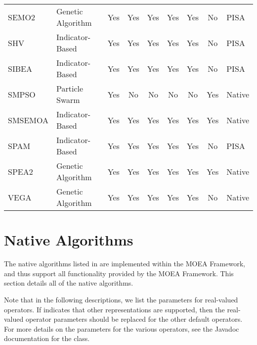 \begin{sidewaystable}
\begin{tabular}{ll|cccccc|l}
  SEMO2 & Genetic Algorithm & \cellcolor{green!25}Yes & \cellcolor{green!25}Yes & \cellcolor{green!25}Yes & \cellcolor{green!25}Yes & \cellcolor{green!25}Yes & \cellcolor{red!25}No & PISA \\
  SHV & Indicator-Based & \cellcolor{green!25}Yes & \cellcolor{green!25}Yes & \cellcolor{green!25}Yes & \cellcolor{green!25}Yes & \cellcolor{green!25}Yes & \cellcolor{red!25}No & PISA \\
  SIBEA & Indicator-Based & \cellcolor{green!25}Yes & \cellcolor{green!25}Yes & \cellcolor{green!25}Yes & \cellcolor{green!25}Yes & \cellcolor{green!25}Yes & \cellcolor{red!25}No & PISA \\
  SMPSO & Particle Swarm & \cellcolor{green!25}Yes & \cellcolor{red!25}No & \cellcolor{red!25}No & \cellcolor{red!25}No & \cellcolor{red!25}No & \cellcolor{green!25}Yes & Native \\
  SMSEMOA & Indicator-Based & \cellcolor{green!25}Yes & \cellcolor{green!25}Yes & \cellcolor{green!25}Yes & \cellcolor{green!25}Yes & \cellcolor{green!25}Yes & \cellcolor{green!25}Yes & Native \\
  SPAM & Indicator-Based & \cellcolor{green!25}Yes & \cellcolor{green!25}Yes & \cellcolor{green!25}Yes & \cellcolor{green!25}Yes & \cellcolor{green!25}Yes & \cellcolor{red!25}No & PISA \\
  SPEA2 & Genetic Algorithm & \cellcolor{green!25}Yes & \cellcolor{green!25}Yes & \cellcolor{green!25}Yes & \cellcolor{green!25}Yes & \cellcolor{green!25}Yes & \cellcolor{green!25}Yes & Native \\
  VEGA & Genetic Algorithm & \cellcolor{green!25}Yes & \cellcolor{green!25}Yes & \cellcolor{green!25}Yes & \cellcolor{green!25}Yes & \cellcolor{green!25}Yes & \cellcolor{red!25}No & Native \\
  \hline
  \end{tabular}
\end{sidewaystable}

\section{Native Algorithms}
The native algorithms listed in  are implemented within the MOEA Framework, and thus support all functionality provided by the MOEA Framework.  This section details all of the native algorithms.

Note that in the following descriptions, we list the parameters for real-valued operators.  If  indicates that other representations are supported, then the real-valued operator parameters should be replaced for the other default operators.  For more details on the parameters for the various operators, see the Javadoc documentation for the  class.

